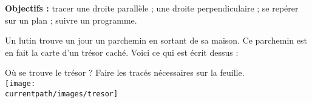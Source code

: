 \begin{changemargin}{-15mm}{-10mm}
\begin{activite}
   \vspace*{-5mm}
   {\bf Objectifs :} tracer une droite parallèle ; une droite perpendiculaire ; se repérer sur un plan ; suivre un programme.
   \par\smallskip
   Un lutin trouve un jour un parchemin en sortant de sa maison.
   Ce parchemin est en fait la carte d’un trésor caché. Voici ce qui est écrit dessus :
      \begin{center}
      \end{center}
      Où se trouve le trésor ? Faire les tracés nécessaires sur la feuille. \\ [3mm]
         \texttt{[image: \\currentpath/images/tresor]}
\end{activite}
\end{changemargin}